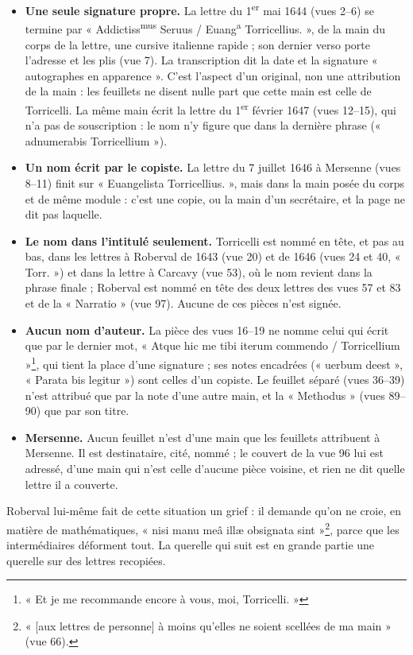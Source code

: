 \documentclass[11pt,a4paper]{article}
\begin{document}
\begin{itemize}
  \item \textbf{Une seule signature propre.} La lettre du 1\textsuperscript{er}
    mai 1644 (vues 2--6) se termine par « Addictiss\textsuperscript{mus} Seruus /
    Euang\textsuperscript{a} Torricellius. », de la main du corps de la lettre,
    une cursive italienne rapide ; son dernier verso porte l'adresse et les plis
    (vue 7). La transcription dit la date et la signature « autographes en
    apparence ». C'est l'aspect d'un original, non une attribution de la main :
    les feuillets ne disent nulle part que cette main est celle de Torricelli.
    La même main écrit la lettre du 1\textsuperscript{er} février 1647 (vues
    12--15), qui n'a pas de souscription : le nom n'y figure que dans la
    dernière phrase (« adnumerabis Torricellium »).
  \item \textbf{Un nom écrit par le copiste.} La lettre du 7 juillet 1646 à
    Mersenne (vues 8--11) finit sur « Euangelista Torricellius. », mais dans la
    main posée du corps et de même module : c'est une copie, ou la main d'un
    secrétaire, et la page ne dit pas laquelle.
  \item \textbf{Le nom dans l'intitulé seulement.} Torricelli est nommé en tête,
    et pas au bas, dans les lettres à Roberval de 1643 (vue 20) et de 1646 (vues
    24 et 40, « Torr. ») et dans la lettre à Carcavy (vue 53), où le nom revient
    dans la phrase finale ; Roberval est nommé en tête des deux lettres des vues
    57 et 83 et de la « Narratio » (vue 97). Aucune de ces pièces n'est signée.
  \item \textbf{Aucun nom d'auteur.} La pièce des vues 16--19 ne nomme celui qui
    écrit que par le dernier mot, « Atque hic me tibi iterum commendo /
    Torricellium »\footnote{« Et je me recommande encore à vous, moi,
    Torricelli. »}, qui tient la place d'une signature ; ses notes encadrées
    (« uerbum deest », « Parata bis legitur ») sont celles d'un copiste. Le
    feuillet séparé (vues 36--39) n'est attribué que par la note d'une autre
    main, et la « Methodus » (vues 89--90) que par son titre.
  \item \textbf{Mersenne.} Aucun feuillet n'est d'une main que les feuillets
    attribuent à Mersenne. Il est destinataire, cité, nommé ; le couvert de la
    vue 96 lui est adressé, d'une main qui n'est celle d'aucune pièce voisine,
    et rien ne dit quelle lettre il a couverte.
\end{itemize}

Roberval lui-même fait de cette situation un grief : il demande qu'on ne croie,
en matière de mathématiques, « nisi manu meâ illæ obsignata sint »\footnote{« [aux lettres de personne] à moins
qu'elles ne soient scellées de ma main » (vue 66).}, parce
que les intermédiaires déforment tout. La querelle qui suit est en grande partie
une querelle sur des lettres recopiées.
\end{document}
